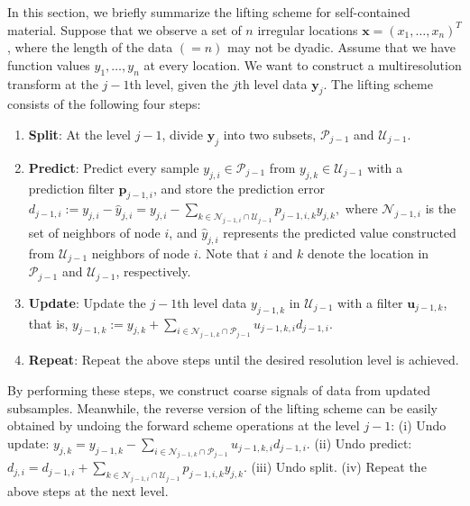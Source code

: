 \documentclass[11pt,titlepage]{article}
\begin{document}
In this section, we briefly summarize the lifting scheme for self-contained material. Suppose that we observe a set of $n$ irregular locations $\bm{x}=(x_{1},\ldots, x_{n})^{T}$, where the length of the data $(=n)$ may not be dyadic. Assume that we have function values $y_1,\ldots, y_n$ at every location. We want to construct a multiresolution transform at the $j-1$th level, given the $j$th level data $\bm{y}_{j}$. The lifting scheme consists of the following four steps:
\begin{enumerate}
\item \textbf{Split}: At the level $j-1$, divide $\bm{y}_{j}$ into two subsets, $\mathcal{P}_{j-1}$ and $\mathcal{U}_{j-1}$. 

\item \textbf{Predict}: Predict every sample $y_{j,i}\in\mathcal{P}_{j-1}$ from $y_{j,k}\in\mathcal{U}_{j-1}$ with a prediction filter $\mathbf{p}_{j-1,i}$, and store the prediction error $d_{j-1,i} := y_{j,i} - \hat{y}_{j,i} = y_{j,i} - \sum_{k \in \mathcal{N}_{j-1,i}\cap \mathcal{U}_{j-1}}p_{j-1,i,k}y_{j,k},$ where $\mathcal{N}_{j-1,i}$ is the set of neighbors of node $i$, and $\hat{y}_{j,i}$ represents the predicted value constructed from $\mathcal{U}_{j-1}$ neighbors of node $i$. Note that $i$ and $k$ denote the location in $\mathcal{P}_{j-1}$ and $\mathcal{U}_{j-1}$, respectively. 

\item \textbf{Update}: Update  the $j-1$th level data $y_{j-1,k}$ in $\mathcal{U}_{j-1}$ with a filter $\mathbf{u}_{j-1,k}$, that is, 
	$y_{j-1,k} := y_{j,k}+\sum_{i\in\mathcal{N}_{j-1,k}\cap \mathcal{P}_{j-1}}u_{j-1,k,i}d_{j-1,i}.$ 
	
\item \textbf{Repeat}: Repeat the above steps until the desired resolution level is achieved.
\end{enumerate}

By performing these steps, we construct coarse signals of data from updated subsamples. Meanwhile, the reverse version of the lifting scheme can be easily obtained by undoing the forward scheme operations at the level $j-1$: (i) Undo update: $ y_{j,k} = y_{j-1,k} - \sum_{i\in\mathcal{N}_{j-1,k}\cap \mathcal{P}_{j-1}}u_{j-1,k,i}d_{j-1,i}.$ (ii) Undo predict: $d_{j,i} = d_{j-1,i} + \sum_{k\in\mathcal{N}_{j-1,i}\cap \mathcal{U}_{j-1}}p_{j-1,i,k}y_{j,k}.$ (iii) Undo split. (iv) Repeat the above steps at the next level.
\end{document}
